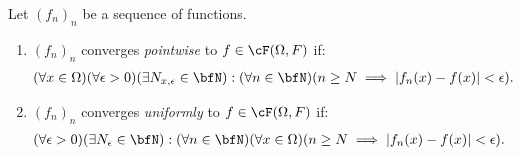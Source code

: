     \begin{center}
    \end{center}

    \begin{definition}
        Let $(f_n)_n$ be a sequence of functions.
        \begin{enumerate}[label = (\arabic*),itemsep=1pt,topsep=3pt]
            \item $(f_n)_n$ converges \textit{pointwise} to $f \in \cF(\Omega,F)$ if:
                \begin{equation*}
                \begin{split}
                    (\forall x \in \Omega)(\forall \epsilon > 0)(\exists N_{x,\epsilon} \in \bfN) : (\forall n \in \bfN)( n \geq N \implies |f_n(x) - f(x)| < \epsilon).
                \end{split}
                \end{equation*}

            \item $(f_n)_n$ converges \textit{uniformly} to $f \in \cF(\Omega,F)$ if:
                \begin{equation*}
                \begin{split}
                        (\forall \epsilon > 0)(\exists N_\epsilon \in \bfN) : (\forall n \in \bfN)(\forall x \in \Omega)(n \geq N &\implies |f_n(x) - f(x)| < \epsilon).
                \end{split}
                \end{equation*}
        \end{enumerate}
    \end{definition}

